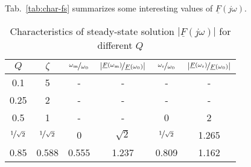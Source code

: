 \documentclass{article}[11pt]
\begin{document}
Tab.~\ref{tab:char-fs} summarizes some interesting values of
$\underline{F}(j\omega)$.
\begin{table}[H]
\centering
\caption{Characteristics of steady-state solution 
  $\left|\underline{F}(j\omega)\right|$ for different $Q$}
\begin{tabular}{cccccc}
\toprule
$Q$                      & $\zeta$                   & $\nicefrac{\omega_{\mathrm{m}}}{\omega_0}$ & $\left|\nicefrac{\underline{F}(\omega_{\mathrm{m}})}{\underline{F}(\omega_{\mathrm{0}})}\right|$ & $\nicefrac{\omega_{\mathrm{r}}}{\omega_0}$ & $\left|\nicefrac{\underline{F}(\omega_{\mathrm{r}})}{\underline{F}(\omega_{\mathrm{0}})}\right|$ \\ \midrule
0.1                      & 5                         & -                                          & -                                                                                                & -                                          & -                                                                                                \\
0.25                     & 2                         & -                                          & -                                                                                                & -                                          & -                                                                                                \\ 
0.5                      & 1                         & -                                          & -                                                                                                & 0                                          & 2                                                                                                \\ 
$\nicefrac{1}{\sqrt{2}}$ & $\nicefrac{1}{\sqrt{2}}$  & 0                                          & $\sqrt{2}$                                                                                       & $\nicefrac{1}{\sqrt{2}}$                   & 1.265                                                                                            \\
0.85                     & 0.588                     & 0.555                                      & 1.237                                                                                            & 0.809                                      & 1.162                                                                                            \\  

\end{tabular}
\end{table}
\end{document}
